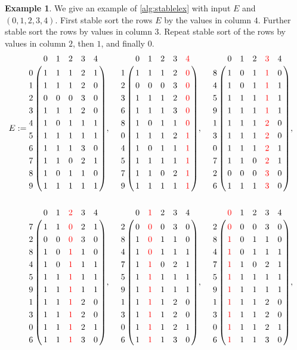 \documentclass[a4paper,10pt,reqno]{amsart}
\theoremstyle{definition}
\newtheorem{example}{Example}
\begin{document}
\begin{example}
We give an example of \autoref{alg:stablelex} with input $E$ and $(0,1,2,3,4)$.
First stable sort the rows $E$ by the values in column $4$. Further stable sort
the rows by values in column $3$.  Repeat stable sort of the rows by values in
column $2$, then $1$, and finally
$0$.
\begin{align*}
    E := &
\bordermatrix{
  & 0 & 1 & 2 & 3 & 4 \cr
0 & 1 & 1 & 1 & 2 & 1 \cr
1 & 1 & 1 & 1 & 2 & 0 \cr
2 & 0 & 0 & 0 & 3 & 0 \cr
3 & 1 & 1 & 1 & 2 & 0 \cr
4 & 1 & 0 & 1 & 1 & 1 \cr
5 & 1 & 1 & 1 & 1 & 1 \cr
6 & 1 & 1 & 1 & 3 & 0 \cr
7 & 1 & 1 & 0 & 2 & 1 \cr
8 & 1 & 0 & 1 & 1 & 0 \cr
9 & 1 & 1 & 1 & 1 & 1 }, \quad
\bordermatrix{
  & 0 & 1 & 2 & 3 & {\color{red} 4} \cr
1 & 1 & 1 & 1 & 2 & {\color{red} 0} \cr
2 & 0 & 0 & 0 & 3 & {\color{red} 0} \cr
3 & 1 & 1 & 1 & 2 & {\color{red} 0} \cr
6 & 1 & 1 & 1 & 3 & {\color{red} 0} \cr  
8 & 1 & 0 & 1 & 1 & {\color{red} 0} \cr
0 & 1 & 1 & 1 & 2 & {\color{red} 1} \cr
4 & 1 & 0 & 1 & 1 & {\color{red} 1} \cr
5 & 1 & 1 & 1 & 1 & {\color{red} 1} \cr
7 & 1 & 1 & 0 & 2 & {\color{red} 1} \cr
9 & 1 & 1 & 1 & 1 & {\color{red} 1}}, \quad
\bordermatrix{
  & 0 & 1 & 2 & {\color{red} 3} & 4 \cr
8 & 1 & 0 & 1 & {\color{red} 1}  & 0 \cr
4 & 1 & 0 & 1 & {\color{red} 1}  & 1 \cr
5 & 1 & 1 & 1 & {\color{red} 1}  & 1 \cr
9 & 1 & 1 & 1 & {\color{red} 1}  & 1 \cr
1 & 1 & 1 & 1 & {\color{red} 2}  & 0 \cr
3 & 1 & 1 & 1 & {\color{red} 2}  & 0 \cr
0 & 1 & 1 & 1 & {\color{red} 2}  & 1 \cr
7 & 1 & 1 & 0 & {\color{red} 2}  & 1 \cr
2 & 0 & 0 & 0 & {\color{red} 3}  & 0 \cr
6 & 1 & 1 & 1 & {\color{red} 3}  & 0}, \\
  & \phantom{A}\\
  &
\bordermatrix{
  & 0 & 1 & {\color{red} 2} & 3 & 4 \cr
7 & 1 & 1 & {\color{red} 0} & 2 & 1 \cr
2 & 0 & 0 & {\color{red} 0} & 3 & 0 \cr
8 & 1 & 0 & {\color{red} 1} & 1 & 0 \cr
4 & 1 & 0 & {\color{red} 1} & 1 & 1 \cr
5 & 1 & 1 & {\color{red} 1} & 1 & 1 \cr
9 & 1 & 1 & {\color{red} 1} & 1 & 1 \cr
1 & 1 & 1 & {\color{red} 1} & 2 & 0 \cr
3 & 1 & 1 & {\color{red} 1} & 2 & 0 \cr
0 & 1 & 1 & {\color{red} 1} & 2 & 1 \cr
6 & 1 & 1 & {\color{red} 1} & 3 & 0}, \quad  
\bordermatrix{
  & 0 & {\color{red} 1} & 2 & 3 & 4 \cr
2 & 0 & {\color{red} 0} & 0 & 3 & 0 \cr
8 & 1 & {\color{red} 0} & 1 & 1 & 0 \cr
4 & 1 & {\color{red} 0} & 1 & 1 & 1 \cr
7 & 1 & {\color{red} 1} & 0 & 2 & 1 \cr
5 & 1 & {\color{red} 1} & 1 & 1 & 1 \cr
9 & 1 & {\color{red} 1} & 1 & 1 & 1 \cr
1 & 1 & {\color{red} 1} & 1 & 2 & 0 \cr
3 & 1 & {\color{red} 1} & 1 & 2 & 0 \cr
0 & 1 & {\color{red} 1} & 1 & 2 & 1 \cr
6 & 1 & {\color{red} 1} & 1 & 3 & 0}, \quad  
\bordermatrix{
  & {\color{red} 0} & 1 & 2 & 3 & 4 \cr
2 & {\color{red} 0} & 0 & 0 & 3 & 0 \cr
8 & {\color{red} 1} & 0 & 1 & 1 & 0 \cr
4 & {\color{red} 1} & 0 & 1 & 1 & 1 \cr
7 & {\color{red} 1} & 1 & 0 & 2 & 1 \cr
5 & {\color{red} 1} & 1 & 1 & 1 & 1 \cr
9 & {\color{red} 1} & 1 & 1 & 1 & 1 \cr
1 & {\color{red} 1} & 1 & 1 & 2 & 0 \cr
3 & {\color{red} 1} & 1 & 1 & 2 & 0 \cr
0 & {\color{red} 1} & 1 & 1 & 2 & 1 \cr
6 & {\color{red} 1} & 1 & 1 & 3 & 0}, \quad  
\end{align*}
\end{example}
\end{document}
